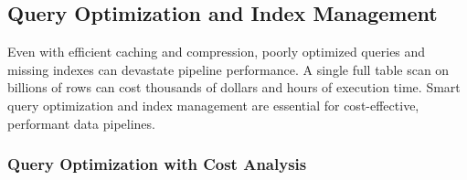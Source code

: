 \subsection{Query Optimization and Index Management}

Even with efficient caching and compression, poorly optimized queries and missing indexes can devastate pipeline performance. A single full table scan on billions of rows can cost thousands of dollars and hours of execution time. Smart query optimization and index management are essential for cost-effective, performant data pipelines.

\subsubsection{Query Optimization with Cost Analysis}

